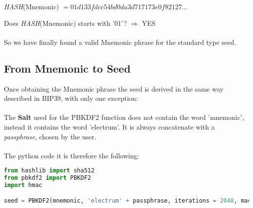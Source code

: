 \begin{center}
	\textit{HASH}(Mnemonic) $= 01d133fdcc54bd0da3d717173e0f82127...$
\end{center}
Does \textit{HASH}(Mnemonic) starts with '01'? $\Rightarrow$ YES
\\ \\
So we have finally found a valid Mnemonic phrase for the standard type seed.


\subsection{From Mnemonic to Seed}
Once obtaining the Mnemonic phrase the seed is derived in the same way described in BIP39, with only one exception:
\\ \\
The \textbf{Salt} used for the PBKDF2 function does not contain the word 'mnemonic', instead it contains the word 'electrum'. It is always concatenate with a \textit{passphrase}, chosen by the user.
\\ \\
The python code it is therefore the following:  

\begin{lstlisting}[language=Python]
from hashlib import sha512
from pbkdf2 import PBKDF2
import hmac

seed = PBKDF2(mnemonic, 'electrum' + passphrase, iterations = 2048, macmodule = hmac, digestmodule = sha512).read(64)
\end{lstlisting}


